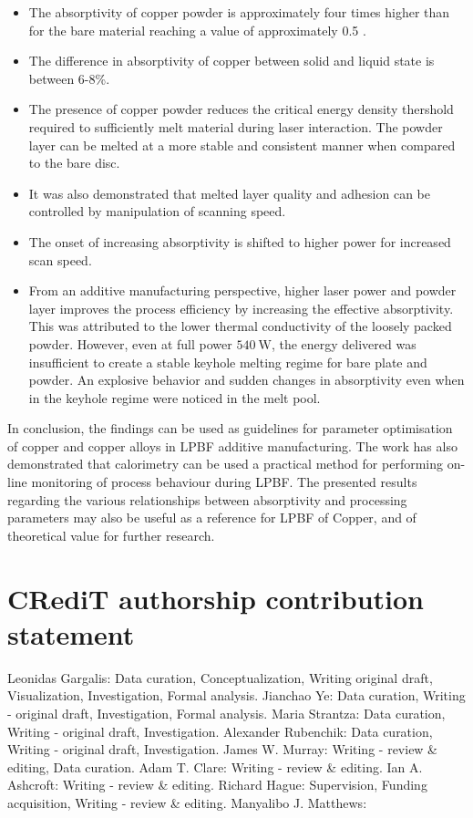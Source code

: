 \documentclass[10pt]{article}
\begin{document}
\begin{itemize}
  \item The absorptivity of copper powder is approximately four times higher than for the bare material reaching a value of approximately 0.5 .
  \item The difference in absorptivity of copper between solid and liquid state is between 6-8\%.
  \item The presence of copper powder reduces the critical energy density thershold required to sufficiently melt material during laser interaction. The powder layer can be melted at a more stable and consistent manner when compared to the bare disc.
  \item It was also demonstrated that melted layer quality and adhesion can be controlled by manipulation of scanning speed.
  \item The onset of increasing absorptivity is shifted to higher power for increased scan speed.
  \item From an additive manufacturing perspective, higher laser power and powder layer improves the process efficiency by increasing the effective absorptivity. This was attributed to the lower thermal conductivity of the loosely packed powder. However, even at full power $540 \mathrm{~W}$, the energy delivered was insufficient to create a stable keyhole melting regime for bare plate and powder. An explosive behavior and sudden changes in absorptivity even when in the keyhole regime were noticed in the melt pool.
\end{itemize}

In conclusion, the findings can be used as guidelines for parameter optimisation of copper and copper alloys in LPBF additive manufacturing. The work has also demonstrated that calorimetry can be used a practical method for performing on-line monitoring of process behaviour during LPBF. The presented results regarding the various relationships between absorptivity and processing parameters may also be useful as a reference for LPBF of Copper, and of theoretical value for further research.

\section*{CRediT authorship contribution statement}
Leonidas Gargalis: Data curation, Conceptualization, Writing original draft, Visualization, Investigation, Formal analysis. Jianchao Ye: Data curation, Writing - original draft, Investigation, Formal analysis. Maria Strantza: Data curation, Writing - original draft, Investigation. Alexander Rubenchik: Data curation, Writing - original draft, Investigation. James W. Murray: Writing - review \& editing, Data curation. Adam T. Clare: Writing - review \& editing. Ian A. Ashcroft: Writing - review \& editing. Richard Hague: Supervision, Funding acquisition, Writing - review \& editing. Manyalibo J. Matthews:
\end{document}

